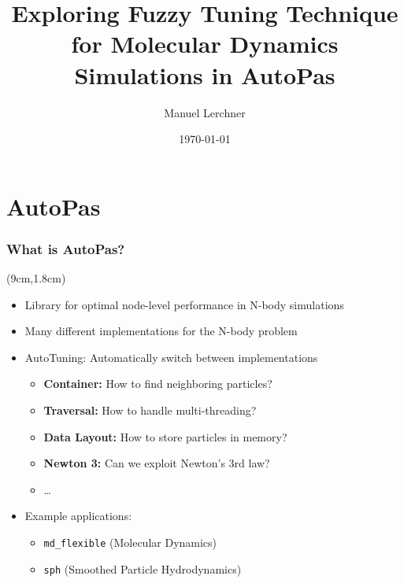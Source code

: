 \documentclass[
	10pt,
	t		%
]{beamer}
\title{Exploring Fuzzy Tuning Technique for Molecular Dynamics Simulations in AutoPas}
\author{Manuel Lerchner}
\date{\today}
\begin{document}
\maketitle


\section{AutoPas}
\begin{frame}
	\frametitle{What is AutoPas?}

	\begin{textblock*}{5cm}(9cm,1.8cm)
		
	\end{textblock*}


	\begin{itemize}
		\item Library for optimal node-level performance in N-body simulations
		\item Many different implementations for the N-body problem
		\item AutoTuning: Automatically switch between implementations
		      \begin{itemize}
			      \item \textbf{Container:} How to find neighboring particles?
			      \item \textbf{Traversal:} How to handle multi-threading?
			      \item \textbf{Data Layout:} How to store particles in memory?
			      \item \textbf{Newton 3:} Can we exploit Newton's 3rd law?
			      \item \dots
		      \end{itemize}
		\item Example applications:
		      \begin{itemize}
			      \item \texttt{md\_flexible} (Molecular Dynamics)
			      \item \texttt{sph} (Smoothed Particle Hydrodynamics)
		      \end{itemize}
	\end{itemize}
\end{frame}
\end{document}
